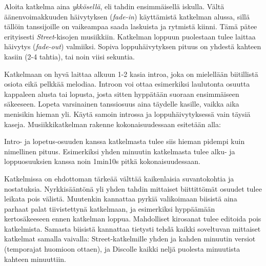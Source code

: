 \documentclass[12pt, a4paper, oneside]{article}
\begin{document}
Aloita katkelma aina \textit{ykkösellä}, eli tahdin ensimmäisellä iskulla. Vältä äänenvoimakkuuden häivytyksen (\textit{fade-in}) käyttämistä katkelman alussa, sillä tällöin tanssijoille on vaikeampaa saada laskuista ja rytmistä kiinni. Tämä pätee erityisesti \textit{Street}-kisojen musiikkiin. Katkelman loppuun puolestaan tulee laittaa häivytys (\textit{fade-out}) valmiiksi. Sopiva loppuhäivytyksen pituus on yhdestä kahteen kasiin (2-4 tahtia), tai noin viisi sekuntia.

Katkelmaan on hyvä laittaa alkuun 1-2 kasia introa, joka on mielellään biitillistä osiota eikä pelkkää melodiaa. Introon voi ottaa esimerkiksi laulutonta osuutta kappaleen alusta tai lopusta, josta sitten hyppätään suoraan ensimmäiseen säkeeseen. Lopeta varsinainen tanssiosuus aina täydelle kasille, vaikka aika menisikin hieman yli. Käytä samoin introssa ja loppuhäivytyksessä vain täysiä kaseja. Musiikkikatkelman rakenne kokonaisuudessaan esitetään alla: \\

\begin{figure}[!h]
    \centering
    \semiboldfont
\end{figure}

Intro- ja lopetus-osuuden kanssa katkelmasta tulee siis hieman pidempi kuin nimellinen pituus. Esimerkiksi yhden minuutin katkelmasta tulee alku- ja loppuosuuksien kanssa noin 1min10s pitkä kokonaisuudessaan.

Katkelmissa on ehdottoman tärkeää välttää kaikenlaisia suvantokohtia ja nostatuksia. Nyrkkisääntönä yli yhden tahdin mittaiset biittittömät osuudet tulee leikata pois välistä. Muutenkin kannattaa pyrkiä valikoimaan biisistä aina parhaat palat tiivistettynä katkelmaan, ja esimerkiksi hyppäämään kertosäkeeseen ennen katkelman loppua. Mahdolliset kirosanat tulee editoida pois katkelmista. Samasta biisistä kannattaa tietysti tehdä kaikki soveltuvan mittaiset katkelmat samalla vaivalla: Street-katkelmille yhden ja kahden minuutin versiot (temporajat huomioon ottaen), ja Discolle kaikki neljä puolesta minuutista kahteen minuuttiin.
\end{document}
